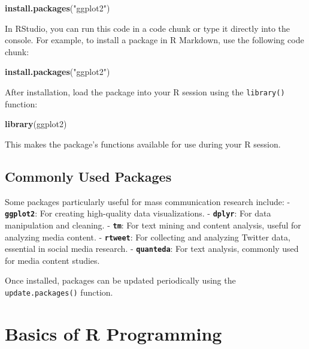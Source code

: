 \documentclass[
]{book}
\newenvironment{Shaded}{\begin{snugshade}}{\end{snugshade}}
\newcommand{\FunctionTok}[1]{\textcolor[rgb]{0.13,0.29,0.53}{\textbf{#1}}}
\newcommand{\NormalTok}[1]{#1}
\newcommand{\StringTok}[1]{\textcolor[rgb]{0.31,0.60,0.02}{#1}}
\begin{document}
\begin{Shaded}
\begin{Highlighting}[]
\FunctionTok{install.packages}\NormalTok{(}\StringTok{"ggplot2"}\NormalTok{)}
\end{Highlighting}
\end{Shaded}

In RStudio, you can run this code in a code chunk or type it directly into the console. For example, to install a package in R Markdown, use the following code chunk:

\begin{Shaded}
\begin{Highlighting}[]
\FunctionTok{install.packages}\NormalTok{(}\StringTok{"ggplot2"}\NormalTok{)}
\end{Highlighting}
\end{Shaded}

After installation, load the package into your R session using the \texttt{library()} function:

\begin{Shaded}
\begin{Highlighting}[]
\FunctionTok{library}\NormalTok{(ggplot2)}
\end{Highlighting}
\end{Shaded}

This makes the package's functions available for use during your R session.

\subsection*{Commonly Used Packages}\label{commonly-used-packages}

Some packages particularly useful for mass communication research include: - \textbf{\texttt{ggplot2}}: For creating high-quality data visualizations. - \textbf{\texttt{dplyr}}: For data manipulation and cleaning. - \textbf{\texttt{tm}}: For text mining and content analysis, useful for analyzing media content. - \textbf{\texttt{rtweet}}: For collecting and analyzing Twitter data, essential in social media research. - \textbf{\texttt{quanteda}}: For text analysis, commonly used for media content studies.

Once installed, packages can be updated periodically using the \texttt{update.packages()} function.

\section{Basics of R Programming}\label{basics-of-r-programming}
\end{document}
